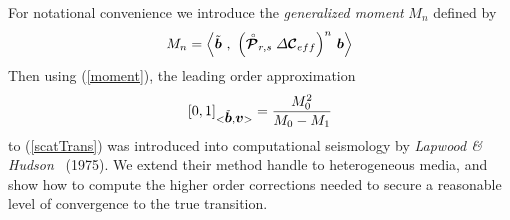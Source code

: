 For notational convenience we introduce the {\em generalized moment\/} 
${ M}_{  n}$ defined by
\begin{equation} 	\label{moment}
{  M}_{  n}=\left\langle\tilde{\bmi   b}\  , \
	{\left(\rf{\CB P}_{r,s} {\mit \Delta}{\CB C}_{eff}\right)}^{n}\ 
	{\bmi  b}\right\rangle
\end{equation}
Then using (\ref{moment}), the  leading order approximation
\begin{equation} \label{pade01}
	{[0,1]}_{<\tilde{\mbox{\boldmath$\mit b$\unboldmath}},{\mbox{\boldmath$\mit v$\unboldmath}}>}={\frac{{M}_{0}^{2}}{{M}_{0}-{M}_{1}}}
\end{equation}
to (\ref{scatTrans}) was 
introduced into computational seismology by {\em Lapwood \& Hudson\/} 
~(1975).
We extend their method handle to heterogeneous media, and show how to 
compute the higher order corrections needed to secure a reasonable level 
of convergence to the true transition.

